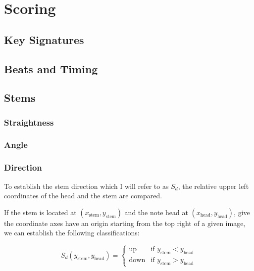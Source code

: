 \section{Scoring}

\subsection{Key Signatures}

\subsection{Beats and Timing}

\subsection{Stems}
\subsubsection{Straightness}


\subsubsection{Angle}


\subsubsection{Direction}

To establish the stem direction which I will refer to as $S_d$, the relative upper left coordinates of the head and the stem are compared.

If the stem is located at $(x_{\text{stem}}, y_{\text{stem}})$ and the note head at $(x_{\text{head}}, y_{\text{head}})$, give the coordinate axes have an origin starting from the top right of a given image, we can establish the following classifications:

$$
S_{d} (y_{\text{stem}}, y_{\text{head}}) =
\left\{
	\begin{array}{ll}
		\text{up}   & \mbox{if } y_{\text{stem}} < y_{\text{head}} \\
		\text{down} & \mbox{if } y_{\text{stem}} > y_{\text{head}}
	\end{array}
\right.
$$

